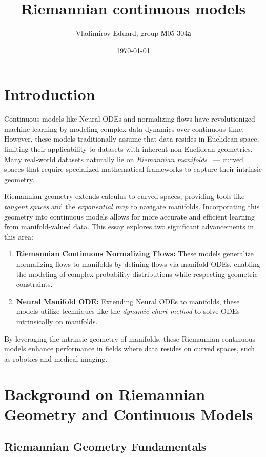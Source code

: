 \documentclass[a4paper,14pt]{article}
\author{Vladimirov Eduard, group М05-304а}
\title{\textbf{Riemannian continuous models}}
\date{\today}
\theoremstyle{plain} %
\theoremstyle{definition} %
\theoremstyle{remark} %
\begin{document}
	\maketitle
	
	\section{Introduction}
	
	Continuous models like Neural ODEs and normalizing flows have revolutionized machine learning by modeling complex data dynamics over continuous time. However, these models traditionally assume that data resides in Euclidean space, limiting their applicability to datasets with inherent non-Euclidean geometries. Many real-world datasets naturally lie on \emph{Riemannian manifolds} ~--- curved spaces that require specialized mathematical frameworks to capture their intrinsic geometry.
	
	Riemannian geometry extends calculus to curved spaces, providing tools like \emph{tangent spaces} and the \emph{exponential map} to navigate manifolds. Incorporating this geometry into continuous models allows for more accurate and efficient learning from manifold-valued data. This essay explores two significant advancements in this area:
	
	\begin{enumerate}
		\item \textbf{Riemannian Continuous Normalizing Flows:} These models generalize normalizing flows to manifolds by defining flows via manifold ODEs, enabling the modeling of complex probability distributions while respecting geometric constraints.
		
		\item \textbf{Neural Manifold ODE:} Extending Neural ODEs to manifolds, these models utilize techniques like the \emph{dynamic chart method} to solve ODEs intrinsically on manifolds.
	\end{enumerate}
	
	By leveraging the intrinsic geometry of manifolds, these Riemannian continuous models enhance performance in fields where data resides on curved spaces, such as robotics and medical imaging.
	
	\section{Background on Riemannian Geometry and Continuous Models}
	
	\subsection{Riemannian Geometry Fundamentals}
	
\end{document}
